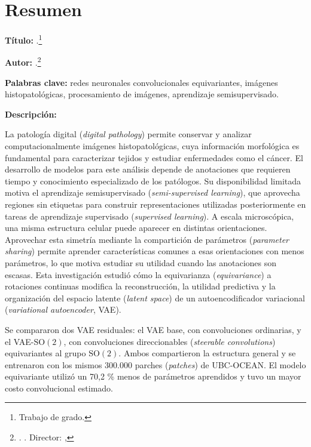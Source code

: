 \cleardoublepage
\chapter*{Resumen}

\textbf{Título:} \Title.\footnote{Trabajo de grado.}

\textbf{Autor:} \Author.\footnote{\FacultyName. \SchoolName. Director: \DirectorName, \DirectorDegree}

\textbf{Palabras clave:} redes neuronales convolucionales equivariantes, imágenes histopatológicas, procesamiento de imágenes, aprendizaje semisupervisado.

\textbf{Descripción:}

\begingroup\small

La patología digital (\emph{digital pathology}) permite conservar y analizar computacionalmente imágenes
histopatológicas, cuya información morfológica es fundamental para caracterizar tejidos
y estudiar enfermedades como el cáncer. El desarrollo de modelos para este análisis
depende de anotaciones que requieren tiempo y conocimiento especializado de los
patólogos. Su disponibilidad limitada motiva el aprendizaje semisupervisado
(\emph{semi-supervised learning}), que
aprovecha regiones sin etiquetas para construir representaciones utilizadas
posteriormente en tareas de aprendizaje supervisado (\emph{supervised learning}). A escala microscópica, una misma estructura
celular puede aparecer en distintas orientaciones. Aprovechar esta simetría mediante la
compartición de parámetros (\emph{parameter sharing}) permite aprender características comunes a esas orientaciones
con menos parámetros, lo que motiva estudiar su utilidad cuando las anotaciones son
escasas. Esta investigación estudió cómo la equivarianza (\emph{equivariance})
a rotaciones continuas modifica
la reconstrucción, la utilidad predictiva y la organización del espacio latente
(\emph{latent space}) de un
autoencodificador variacional (\emph{variational autoencoder}, VAE).

Se compararon dos VAE residuales: el VAE base, con convoluciones ordinarias, y el
VAE-\(\mathrm{SO}(2)\), con convoluciones direccionables
(\emph{steerable convolutions}) equivariantes al grupo \(\mathrm{SO}(2)\).
Ambos compartieron la estructura general y se entrenaron
con los mismos 300.000 parches (\emph{patches}) de UBC-OCEAN. El modelo equivariante utilizó
un 70,2 \% menos de parámetros aprendidos y tuvo un mayor costo convolucional
estimado.

